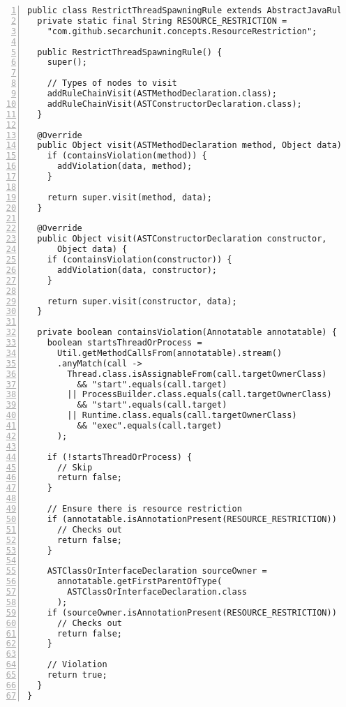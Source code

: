 \begin{lstlisting}[caption={Constraint 5.}, captionpos=b, label=lst:pmd_5, numbers=left, showstringspaces=false]
public class RestrictThreadSpawningRule extends AbstractJavaRule {
  private static final String RESOURCE_RESTRICTION =
    "com.github.secarchunit.concepts.ResourceRestriction";

  public RestrictThreadSpawningRule() {
    super();

    // Types of nodes to visit
    addRuleChainVisit(ASTMethodDeclaration.class);
    addRuleChainVisit(ASTConstructorDeclaration.class);
  }

  @Override
  public Object visit(ASTMethodDeclaration method, Object data) {
    if (containsViolation(method)) {
      addViolation(data, method);
    }

    return super.visit(method, data);
  }

  @Override
  public Object visit(ASTConstructorDeclaration constructor,
      Object data) {
    if (containsViolation(constructor)) {
      addViolation(data, constructor);
    }

    return super.visit(constructor, data);
  }

  private boolean containsViolation(Annotatable annotatable) {
    boolean startsThreadOrProcess =
      Util.getMethodCallsFrom(annotatable).stream()
      .anyMatch(call ->
        Thread.class.isAssignableFrom(call.targetOwnerClass)
          && "start".equals(call.target)
        || ProcessBuilder.class.equals(call.targetOwnerClass)
          && "start".equals(call.target)
        || Runtime.class.equals(call.targetOwnerClass)
          && "exec".equals(call.target)
      );

    if (!startsThreadOrProcess) {
      // Skip
      return false;
    }

    // Ensure there is resource restriction
    if (annotatable.isAnnotationPresent(RESOURCE_RESTRICTION)) {
      // Checks out
      return false;
    }

    ASTClassOrInterfaceDeclaration sourceOwner =
      annotatable.getFirstParentOfType(
        ASTClassOrInterfaceDeclaration.class
      );
    if (sourceOwner.isAnnotationPresent(RESOURCE_RESTRICTION)) {
      // Checks out
      return false;
    }

    // Violation
    return true;
  }
}
\end{lstlisting}